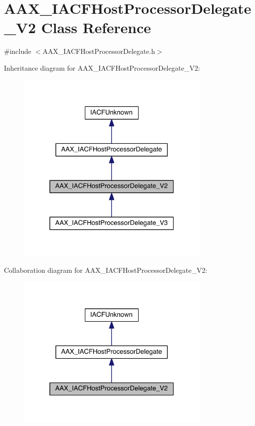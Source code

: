 \hypertarget{a00069}{}\section{A\+A\+X\+\_\+\+I\+A\+C\+F\+Host\+Processor\+Delegate\+\_\+\+V2 Class Reference}
\label{a00069}


{\ttfamily \#include $<$A\+A\+X\+\_\+\+I\+A\+C\+F\+Host\+Processor\+Delegate.\+h$>$}



Inheritance diagram for A\+A\+X\+\_\+\+I\+A\+C\+F\+Host\+Processor\+Delegate\+\_\+\+V2\+:
\nopagebreak
\begin{figure}[H]
\begin{center}
\leavevmode
\includegraphics[width=268pt]{a00550}
\end{center}
\end{figure}


Collaboration diagram for A\+A\+X\+\_\+\+I\+A\+C\+F\+Host\+Processor\+Delegate\+\_\+\+V2\+:
\nopagebreak
\begin{figure}[H]
\begin{center}
\leavevmode
\includegraphics[width=268pt]{a00551}
\end{center}
\end{figure}


